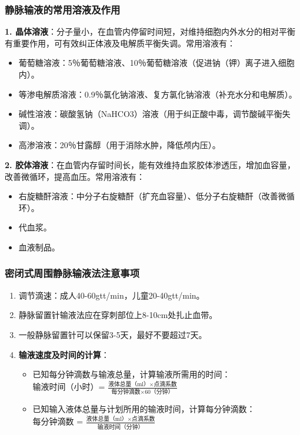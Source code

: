 \documentclass[11pt, a4paper]{ctexart}
\begin{document}
\subsubsection{静脉输液的常用溶液及作用}
\textbf{1. 晶体溶液}：分子量小，在血管内停留时间短，对维持细胞内外水分的相对平衡有重要作用，可有效纠正体液及电解质平衡失调。常用溶液有：
\begin{itemize}
    \item 葡萄糖溶液：5％葡萄糖溶液、10％葡萄糖溶液（促进钠（钾）离子进入细胞内）。
    \item 等渗电解质溶液：0.9％氯化钠溶液、复方氯化钠溶液（补充水分和电解质）。
    \item 碱性溶液：碳酸氢钠（NaHCO3）溶液（用于纠正酸中毒，调节酸碱平衡失调）。
    \item 高渗溶液：20％甘露醇（用于消除水肿，降低颅内压）。
\end{itemize}

\textbf{2. 胶体溶液}：在血管内存留时间长，能有效维持血浆胶体渗透压，增加血容量，改善微循环，提高血压。常用溶液有：
\begin{itemize}
    \item 右旋糖酐溶液：中分子右旋糖酐（扩充血容量）、低分子右旋糖酐（改善微循环）。
    \item 代血浆。
    \item 血液制品。
\end{itemize}

\subsubsection{密闭式周围静脉输液法注意事项}
\begin{enumerate}
    \item 调节滴速：成人40-60gtt/min，儿童20-40gtt/min。
    \item 静脉留置针输液法应在穿刺部位上8-10cm处扎止血带。
    \item 一般静脉留置针可以保留3-5天，最好不要超过7天。
    \item \textbf{输液速度及时间的计算}：
    \begin{itemize}
        \item 已知每分钟滴数与输液总量，计算输液所需用的时间：\\
        输液时间（小时）= $\frac{\text{液体总量（ml）×点滴系数}}{\text{每分钟滴数×60（分钟）}}$
        \item 已知输入液体总量与计划所用的输液时间，计算每分钟滴数：\\
        每分钟滴数 = $\frac{\text{液体总量（ml）×点滴系数}}{\text{输液时间（分钟）}}$
    \end{itemize}
\end{enumerate}
\end{document}
